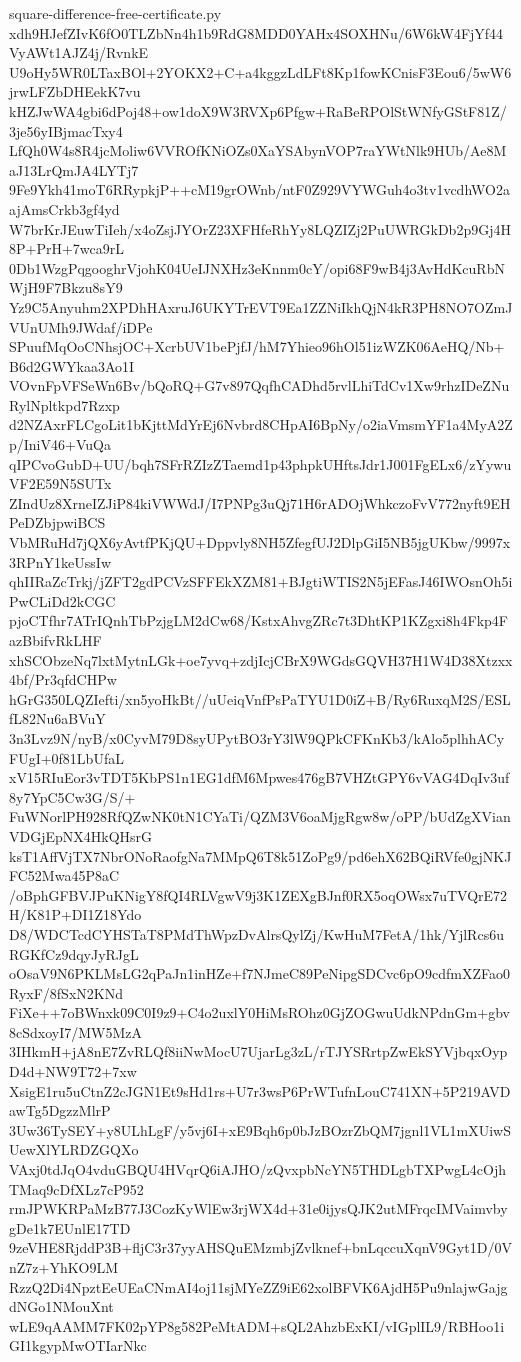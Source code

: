 \documentclass[11pt]{article}
\theoremstyle{definition}
\theoremstyle{remark}
\begin{document}
\begin{filecontents*}[overwrite]{square-difference-free-certificate.py}
xdh9HJefZIvK6fO0TLZbNn4h1b9RdG8MDD0YAHx4SOXHNu/6W6kW4FjYf44VyAWt1AJZ4j/RvnkE
U9oHy5WR0LTaxBOl+2YOKX2+C+a4kggzLdLFt8Kp1fowKCnisF3Eou6/5wW6jrwLFZbDHEekK7vu
kHZJwWA4gbi6dPoj48+ow1doX9W3RVXp6Pfgw+RaBeRPOlStWNfyGStF81Z/3je56yIBjmacTxy4
LfQh0W4s8R4jcMoliw6VVROfKNiOZs0XaYSAbynVOP7raYWtNlk9HUb/Ae8MaJ13LrQmJA4LYTj7
9Fe9Ykh41moT6RRypkjP++cM19grOWnb/ntF0Z929VYWGuh4o3tv1vcdhWO2aajAmsCrkb3gf4yd
W7brKrJEuwTiIeh/x4oZsjJYOrZ23XFHfeRhYy8LQZIZj2PuUWRGkDb2p9Gj4H8P+PrH+7wca9rL
0Db1WzgPqgooghrVjohK04UeIJNXHz3eKnnm0cY/opi68F9wB4j3AvHdKcuRbNWjH9F7Bkzu8sY9
Yz9C5Anyuhm2XPDhHAxruJ6UKYTrEVT9Ea1ZZNiIkhQjN4kR3PH8NO7OZmJVUnUMh9JWdaf/iDPe
SPuufMqOoCNhsjOC+XcrbUV1bePjfJ/hM7Yhieo96hOl51izWZK06AeHQ/Nb+B6d2GWYkaa3Ao1I
VOvnFpVFSeWn6Bv/bQoRQ+G7v897QqfhCADhd5rvlLhiTdCv1Xw9rhzIDeZNuRylNpltkpd7Rzxp
d2NZAxrFLCgoLit1bKjttMdYrEj6Nvbrd8CHpAI6BpNy/o2iaVmsmYF1a4MyA2Zp/IniV46+VuQa
qIPCvoGubD+UU/bqh7SFrRZIzZTaemd1p43phpkUHftsJdr1J001FgELx6/zYywuVF2E59N5SUTx
ZIndUz8XrneIZJiP84kiVWWdJ/I7PNPg3uQj71H6rADOjWhkczoFvV772nyft9EHPeDZbjpwiBCS
VbMRuHd7jQX6yAvtfPKjQU+Dppvly8NH5ZfegfUJ2DlpGiI5NB5jgUKbw/9997x3RPnY1keUssIw
qhIIRaZcTrkj/jZFT2gdPCVzSFFEkXZM81+BJgtiWTIS2N5jEFasJ46IWOsnOh5iPwCLiDd2kCGC
pjoCTfhr7ATrIQnhTbPzjgLM2dCw68/KstxAhvgZRc7t3DhtKP1KZgxi8h4Fkp4FazBbifvRkLHF
xhSCObzeNq7lxtMytnLGk+oe7yvq+zdjIcjCBrX9WGdsGQVH37H1W4D38Xtzxx4bf/Pr3qfdCHPw
hGrG350LQZIefti/xn5yoHkBt//uUeiqVnfPsPaTYU1D0iZ+B/Ry6RuxqM2S/ESLfL82Nu6aBVuY
3n3Lvz9N/nyB/x0CyvM79D8syUPytBO3rY3lW9QPkCFKnKb3/kAlo5plhhACyFUgI+0f81LbUfaL
xV15RIuEor3vTDT5KbPS1n1EG1dfM6Mpwes476gB7VHZtGPY6vVAG4DqIv3uf8y7YpC5Cw3G/S/+
FuWNorlPH928RfQZwNK0tN1CYaTi/QZM3V6oaMjgRgw8w/oPP/bUdZgXVianVDGjEpNX4HkQHsrG
ksT1AffVjTX7NbrONoRaofgNa7MMpQ6T8k51ZoPg9/pd6ehX62BQiRVfe0gjNKJFC52Mwa45P8aC
/oBphGFBVJPuKNigY8fQI4RLVgwV9j3K1ZEXgBJnf0RX5oqOWsx7uTVQrE72H/K81P+DI1Z18Ydo
D8/WDCTcdCYHSTaT8PMdThWpzDvAlrsQylZj/KwHuM7FetA/1hk/YjlRcs6uRGKfCz9dqyJyRJgL
oOsaV9N6PKLMsLG2qPaJn1inHZe+f7NJmeC89PeNipgSDCvc6pO9cdfmXZFao0RyxF/8fSxN2KNd
FiXe++7oBWnxk09C0I9z9+C4o2uxlY0HiMsROhz0GjZOGwuUdkNPdnGm+gbv8cSdxoyI7/MW5MzA
3IHkmH+jA8nE7ZvRLQf8iiNwMocU7UjarLg3zL/rTJYSRrtpZwEkSYVjbqxOypD4d+NW9T72+7xw
XsigE1ru5uCtnZ2cJGN1Et9sHd1rs+U7r3wsP6PrWTufnLouC741XN+5P219AVDawTg5DgzzMlrP
3Uw36TySEY+y8ULhLgF/y5vj6I+xE9Bqh6p0bJzBOzrZbQM7jgnl1VL1mXUiwSUewXlYLRDZGQXo
VAxj0tdJqO4vduGBQU4HVqrQ6iAJHO/zQvxpbNcYN5THDLgbTXPwgL4cOjhTMaq9cDfXLz7cP952
rmJPWKRPaMzB77J3CozKyWlEw3rjWX4d+31e0ijysQJK2utMFrqcIMVaimvbygDe1k7EUnlE17TD
9zeVHE8RjddP3B+fljC3r37yyAHSQuEMzmbjZvlknef+bnLqccuXqnV9Gyt1D/0VnZ7z+YhKO9LM
RzzQ2Di4NpztEeUEaCNmAI4oj11sjMYeZZ9iE62xolBFVK6AjdH5Pu9nlajwGajgdNGo1NMouXnt
wLE9qAAMM7FK02pYP8g582PeMtADM+sQL2AhzbExKI/vIGplIL9/RBHoo1iGI1kgypMwOTIarNkc

\end{filecontents*}
\end{document}
